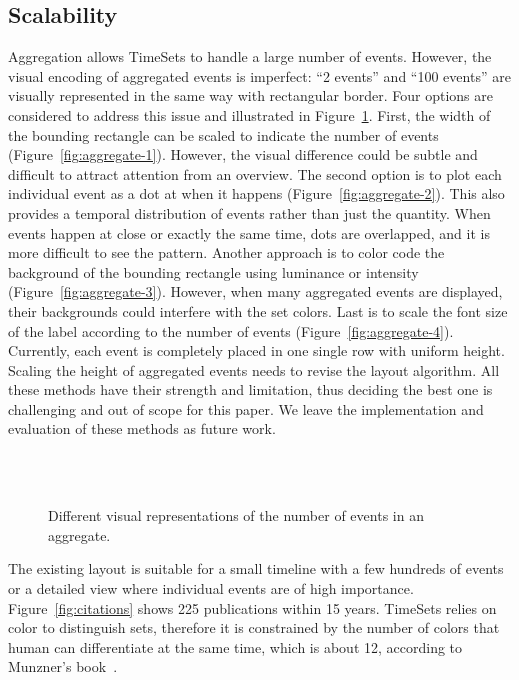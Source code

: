 \subsection{Scalability}
Aggregation allows TimeSets to handle a large number of events. However, the visual encoding of aggregated events is imperfect: ``2 events'' and ``100 events'' are visually represented in the same way with rectangular border. Four options are considered to address this issue and illustrated in Figure~\ref{fig:aggreate}. First, the width of the bounding rectangle can be scaled to indicate the number of events (Figure~\ref{fig:aggregate-1}). However, the visual difference could be subtle and difficult to attract attention from an overview. The second option is to plot each individual event as a dot at when it happens (Figure~\ref{fig:aggregate-2}). This also provides a temporal distribution of events rather than just the quantity. When events happen at close or exactly the same time, dots are overlapped, and it is more difficult to see the pattern. Another approach is to color code the background of the bounding rectangle using luminance or intensity (Figure~\ref{fig:aggregate-3}). However, when many aggregated events are displayed, their backgrounds could interfere with the set colors. Last is to scale the font size of the label according to the number of events (Figure~\ref{fig:aggregate-4}). Currently, each event is completely placed in one single row with uniform height. Scaling the height of aggregated events needs to revise the layout algorithm.	All these methods have their strength and limitation, thus deciding the best one is challenging and out of scope for this paper. We leave the implementation and evaluation of these methods as future work.

\begin{figure}[ht]
	\centering
	\\
	\hfill
	\\
	\hfill
	\caption{Different visual representations of the number of events in an aggregate.}
	\label{fig:aggreate}
\end{figure}

The existing layout is suitable for a small timeline with a few hundreds of events or a detailed view where individual events are of high importance. Figure~\ref{fig:citations} shows 225 publications within 15 years. TimeSets relies on color to distinguish sets, therefore it is constrained by the number of colors that human can differentiate at the same time, which is about 12, according to Munzner's book~\cite{Munzner2014}.